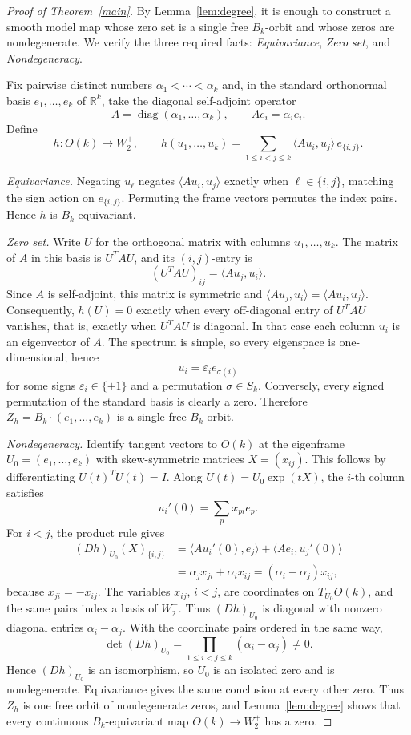 \documentclass[12pt]{article}
\begin{document}
\begin{proof}[Proof of Theorem~\ref{main}]
By Lemma~\ref{lem:degree}, it is enough to construct a smooth model map
whose zero set is a single free $B_k$-orbit and whose zeros are
nondegenerate.  We verify the three required facts:
\textit{Equivariance}, \textit{Zero set}, and \textit{Nondegeneracy}.

Fix pairwise distinct numbers $\alpha_1<\cdots<\alpha_k$ and, in the
standard orthonormal basis $e_1,\ldots,e_k$ of $\mathbb{R}^k$, take the
diagonal self-adjoint operator
\[
 A=\operatorname{diag}(\alpha_1,\ldots,\alpha_k),
 \qquad Ae_i=\alpha_i e_i.
\]
Define
\[
 h:O(k)\longrightarrow W_2^+,
 \qquad
 h(u_1,\ldots,u_k)
 =\sum_{1\le i<j\le k}
 \langle Au_i,u_j\rangle\, e_{\{i,j\}}.
\]

\textit{Equivariance.}
Negating $u_\ell$ negates $\langle Au_i,u_j\rangle$ exactly when
$\ell\in\{i,j\}$, matching the sign action on $e_{\{i,j\}}$.
Permuting the frame vectors permutes the index pairs.
Hence $h$ is $B_k$-equivariant.

\textit{Zero set.}
Write $U$ for the orthogonal matrix with columns $u_1,\ldots,u_k$.
The matrix of $A$ in this basis is $U^TAU$, and its $(i,j)$-entry is
\[
 (U^TAU)_{ij}=\langle Au_j,u_i\rangle.
\]
Since $A$ is self-adjoint, this matrix is symmetric and
$\langle Au_j,u_i\rangle=\langle Au_i,u_j\rangle$.  Consequently,
$h(U)=0$ exactly when every off-diagonal entry of $U^TAU$ vanishes,
that is, exactly when $U^TAU$ is diagonal.  In that case each column
$u_i$ is an eigenvector of $A$.  The spectrum is simple, so every
eigenspace is one-dimensional; hence
\[
 u_i=\varepsilon_i e_{\sigma(i)}
\]
for some signs $\varepsilon_i\in\{\pm1\}$ and a permutation
$\sigma\in S_k$.  Conversely, every signed permutation of the standard
basis is clearly a zero.  Therefore
$Z_h=B_k\cdot(e_1,\ldots,e_k)$ is a single free $B_k$-orbit.

\textit{Nondegeneracy.}
Identify tangent vectors to $O(k)$ at the eigenframe
$U_0=(e_1,\ldots,e_k)$ with skew-symmetric matrices $X=(x_{ij})$.
This follows by differentiating $U(t)^TU(t)=I$.  Along
$U(t)=U_0\exp(tX)$, the $i$-th column satisfies
\[
 u_i'(0)=\sum_p x_{pi}e_p.
\]
For $i<j$, the product rule gives
\begin{align*}
 (Dh)_{U_0}(X)_{\{i,j\}}
 &=\langle Au_i'(0),e_j\rangle
   +\langle Ae_i,u_j'(0)\rangle\\
 &=\alpha_jx_{ji}+\alpha_ix_{ij}
  =(\alpha_i-\alpha_j)x_{ij},
\end{align*}
because $x_{ji}=-x_{ij}$.  The variables $x_{ij}$, $i<j$, are
coordinates on $T_{U_0}O(k)$, and the same pairs index a basis of
$W_2^+$.  Thus $(Dh)_{U_0}$ is diagonal with nonzero diagonal entries
$\alpha_i-\alpha_j$.  With the coordinate pairs ordered in the same way,
\[
 \det (Dh)_{U_0}=\prod_{1\le i<j\le k}(\alpha_i-\alpha_j)\ne0.
\]
Hence $(Dh)_{U_0}$ is an isomorphism, so $U_0$ is an isolated zero and
is nondegenerate.  Equivariance gives the same conclusion at every
other zero.  Thus $Z_h$ is one free orbit of nondegenerate zeros, and
Lemma~\ref{lem:degree} shows that every continuous
$B_k$-equivariant map $O(k)\to W_2^+$ has a zero.
\end{proof}
\end{document}
